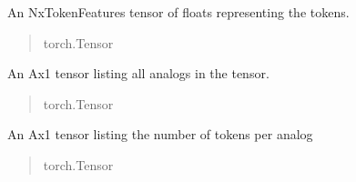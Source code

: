 \documentclass[letterpaper,10pt,english]{sphinxmanual}
\begin{document}
\begin{fulllineitems}
\begin{fulllineitems}
\label{\detokenize{nodes:nodes.nodeTensors.Driver.nodes}}
\pysigstartsignatures
\pysigline
{}
\pysigstopsignatures
\sphinxAtStartPar
An NxTokenFeatures tensor of floats representing the tokens.
\begin{quote}\begin{description}
\sphinxAtStartPar
torch.Tensor

\end{description}\end{quote}

\end{fulllineitems}


\begin{fulllineitems}
\label{\detokenize{nodes:nodes.nodeTensors.Driver.analogs}}
\pysigstartsignatures
\pysigline
{}
\pysigstopsignatures
\sphinxAtStartPar
An Ax1 tensor listing all analogs in the tensor.
\begin{quote}\begin{description}
\sphinxAtStartPar
torch.Tensor

\end{description}\end{quote}

\end{fulllineitems}


\begin{fulllineitems}
\label{\detokenize{nodes:nodes.nodeTensors.Driver.analog_counts}}
\pysigstartsignatures
\pysigline
{}
\pysigstopsignatures
\sphinxAtStartPar
An Ax1 tensor listing the number of tokens per analog
\begin{quote}\begin{description}
\sphinxAtStartPar
torch.Tensor

\end{description}\end{quote}

\end{fulllineitems}


\end{fulllineitems}
\end{document}
